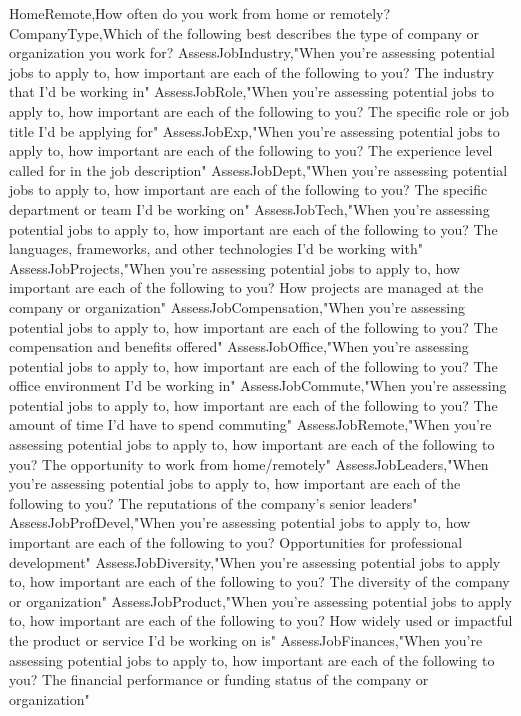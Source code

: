 \begin{appendices}
HomeRemote,How often do you work from home or remotely?
CompanyType,Which of the following best describes the type of company or organization you work for?
AssessJobIndustry,"When you're assessing potential jobs to apply to, how important are each of the following to you? The industry that I'd be working in"
AssessJobRole,"When you're assessing potential jobs to apply to, how important are each of the following to you? The specific role or job title I'd be applying for"
AssessJobExp,"When you're assessing potential jobs to apply to, how important are each of the following to you? The experience level called for in the job description"
AssessJobDept,"When you're assessing potential jobs to apply to, how important are each of the following to you? The specific department or team I'd be working on"
AssessJobTech,"When you're assessing potential jobs to apply to, how important are each of the following to you? The languages, frameworks, and other technologies I'd be working with"
AssessJobProjects,"When you're assessing potential jobs to apply to, how important are each of the following to you? How projects are managed at the company or organization"
AssessJobCompensation,"When you're assessing potential jobs to apply to, how important are each of the following to you? The compensation and benefits offered"
AssessJobOffice,"When you're assessing potential jobs to apply to, how important are each of the following to you? The office environment I'd be working in"
AssessJobCommute,"When you're assessing potential jobs to apply to, how important are each of the following to you? The amount of time I'd have to spend commuting"
AssessJobRemote,"When you're assessing potential jobs to apply to, how important are each of the following to you? The opportunity to work from home/remotely"
AssessJobLeaders,"When you're assessing potential jobs to apply to, how important are each of the following to you? The reputations of the company's senior leaders"
AssessJobProfDevel,"When you're assessing potential jobs to apply to, how important are each of the following to you? Opportunities for professional development"
AssessJobDiversity,"When you're assessing potential jobs to apply to, how important are each of the following to you? The diversity of the company or organization"
AssessJobProduct,"When you're assessing potential jobs to apply to, how important are each of the following to you? How widely used or impactful the product or service I'd be working on is"
AssessJobFinances,"When you're assessing potential jobs to apply to, how important are each of the following to you? The financial performance or funding status of the company or organization"

\end{appendices}
